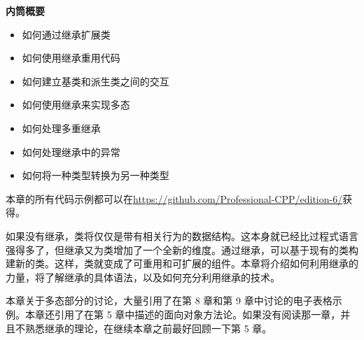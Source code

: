 \noindent
\textbf{内筒概要}

\begin{itemize}
\item
如何通过继承扩展类

\item
如何使用继承重用代码

\item
如何建立基类和派生类之间的交互

\item
如何使用继承来实现多态

\item
如何处理多重继承

\item
如何处理继承中的异常

\item
如何将一种类型转换为另一种类型
\end{itemize}

本章的所有代码示例都可以在\url{https://github.com/Professional-CPP/edition-6/}获得。

如果没有继承，类将仅仅是带有相关行为的数据结构。这本身就已经比过程式语言强得多了，但继承又为类增加了一个全新的维度。通过继承，可以基于现有的类构建新的类。这样，类就变成了可重用和可扩展的组件。本章将介绍如何利用继承的力量，将了解继承的具体语法，以及如何充分利用继承的技术。

本章关于多态部分的讨论，大量引用了在第 8 章和第 9 章中讨论的电子表格示例。本章还引用了在第 5 章中描述的面向对象方法论。如果没有阅读那一章，并且不熟悉继承的理论，在继续本章之前最好回顾一下第 5 章。






























